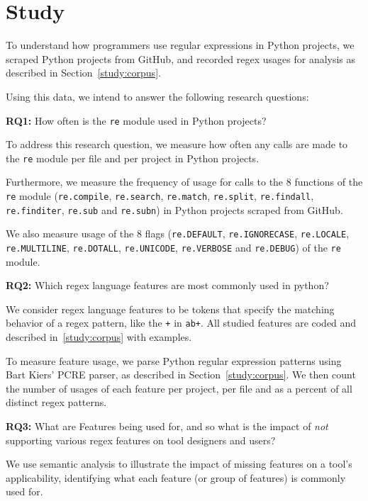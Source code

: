 \section{Study}
\label{sec:study}

To understand how programmers use regular expressions in Python projects, we scraped  Python projects from GitHub, and recorded regex usages for analysis as described in Section~\ref{study:corpus}.

Using this data, we intend to answer the following research questions:

\textbf{RQ1:} How often is the {\tt re} module used in Python projects?

To address this research question, we measure how often any calls are made to the {\tt re} module per file and per project in Python projects.

Furthermore, we measure the frequency of usage for calls to the 8 functions of the {\tt re} module ({\tt re.compile}, {\tt re.search}, {\tt re.match}, {\tt re.split}, {\tt re.findall}, {\tt re.finditer}, {\tt re.sub} and {\tt re.subn}) in Python projects scraped from GitHub.

We also measure usage of the 8 flags ({\tt re.DEFAULT}, {\tt re.IGNORECASE}, {\tt re.LOCALE}, {\tt re.MULTILINE}, {\tt re.DOTALL}, {\tt re.UNICODE}, {\tt re.VERBOSE} and {\tt re.DEBUG}) of the {\tt re} module.

\textbf{RQ2:} Which regex language features are most commonly used in python?

We consider regex language features to be tokens that specify the matching behavior of a regex pattern, like the {\tt +} in {\tt ab+}.  All studied features are coded and described in~\ref{study:corpus} with examples.

To measure feature usage, we parse Python regular expression patterns using Bart Kiers' PCRE parser, as described in Section~\ref{study:corpus}.  We then count the number of usages of each feature per project, per file and as a percent of all distinct regex patterns.

\textbf{RQ3:} What are Features being used for, and so what is the impact of \emph{not} supporting various regex features on tool designers and users?

We use semantic analysis to illustrate the impact of missing features on a tool's applicability, identifying what each feature (or group of features) is commonly used for.

